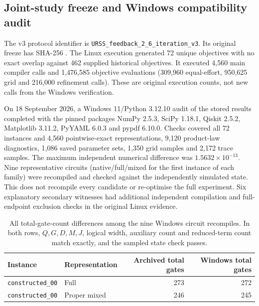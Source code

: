 \documentclass[a4paper,onecolumn,11pt,unpublished]{quantumarticle}
\theoremstyle{remark}
\begin{document}
\subsection{Joint-study freeze and Windows compatibility audit}\label{app:v3-portability}
The v3 protocol identifier is \nolinkurl{URSS_feedback_2_6_iteration_v3}.
Its original freeze has SHA-256
\texttt{}.
The Linux execution generated 72 unique objectives with no exact overlap against 462 supplied historical objectives. It executed 4,560 main compiler calls and 1,476,585 objective evaluations (309,960 equal-effort, 950,625 grid and 216,000 refinement calls). These are original execution counts, not new calls from the Windows verification.

On 18 September 2026, a Windows 11/Python 3.12.10 audit of the stored results completed with the pinned packages NumPy 2.5.3, SciPy 1.18.1, Qiskit 2.5.2, Matplotlib 3.11.2, PyYAML 6.0.3 and pypdf 6.10.0. Checks covered all 72 instances and 4,560 pointwise-exact representations, 9,120 product-law diagnostics, 1,086 saved parameter sets, 1,350 grid samples and 2,172 trace samples. The maximum independent numerical difference was $1.5632\times10^{-13}$. Nine representative circuits (native/full/mixed for the first instance of each family) were recompiled and checked against the independently simulated state. This does not recompile every candidate or re-optimise the full experiment. Six explanatory secondary witnesses had additional independent compilation and full-endpoint exclusion checks in the original Linux evidence.

\begin{table}[htbp]\centering\small
\caption{All total-gate-count differences among the nine Windows circuit recompiles. In both rows, $Q,G,D,M,J$, logical width, auxiliary count and reduced-term count match exactly, and the sampled state check passes.}\label{tab:v3-windows}
\begin{tabular}{llrr}\toprule
Instance & Representation & Archived total gates & Windows total gates\\\midrule
\texttt{constructed\_00} & Full & 273 & 272\\
\texttt{constructed\_00} & Proper mixed & 246 & 245\\\bottomrule
\end{tabular}\end{table}
\FloatBarrier
\end{document}
